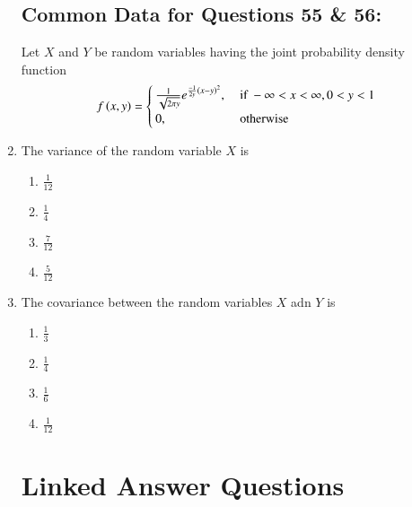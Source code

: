 \documentclass[journal]{IEEEtran}
\begin{document}
\begin{enumerate}
\subsection*{Common Data for Questions 55 \& 56:}
Let $X$ and $Y$ be random variables having the joint probability density function
\begin{align*}
    f\left(x,y\right) = 
    \begin{cases}
        \frac{1}{\sqrt{2 \pi y}} e^{\frac{-1}{2y}\left(x-y\right)^2}, & \text{ if } -\infty < x < \infty, 0 < y < 1\\
        0, & \text{ otherwise }
    \end{cases}
\end{align*}
\item The variance of the random variable $X$ is
\begin{multicols}{2}
    \begin{enumerate}
        \item $\frac{1}{12}$
        \item $\frac{1}{4}$
        \item $\frac{7}{12}$
        \item $\frac{5}{12}$
    \end{enumerate}
\end{multicols}
\item The covariance between the random variables $X$ adn $Y$ is
\begin{multicols}{2}
    \begin{enumerate}
        \item $\frac{1}{3}$
        \item $\frac{1}{4}$
        \item $\frac{1}{6}$
        \item $\frac{1}{12}$
    \end{enumerate}
\end{multicols}

\section*{Linked Answer Questions}

\end{enumerate}
\end{document}

